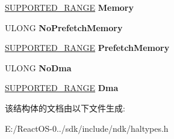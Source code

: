 \begin{DoxyCompactItemize}
\hyperlink{struct___s_u_p_p_o_r_t_e_d___r_a_n_g_e}{S\+U\+P\+P\+O\+R\+T\+E\+D\+\_\+\+R\+A\+N\+GE} {\bfseries Memory}
\item 
\mbox{\label{struct___s_u_p_p_o_r_t_e_d___r_a_n_g_e_s_a9b2a5d9a69304b85407dec15cbaf282f}} 
U\+L\+O\+NG {\bfseries No\+Prefetch\+Memory}
\item 
\mbox{\label{struct___s_u_p_p_o_r_t_e_d___r_a_n_g_e_s_a5c1184cc07a8a0029768b1ac4da22d4b}} 
\hyperlink{struct___s_u_p_p_o_r_t_e_d___r_a_n_g_e}{S\+U\+P\+P\+O\+R\+T\+E\+D\+\_\+\+R\+A\+N\+GE} {\bfseries Prefetch\+Memory}
\item 
\mbox{\label{struct___s_u_p_p_o_r_t_e_d___r_a_n_g_e_s_a9763656cea2a66838b07d43a1f010869}} 
U\+L\+O\+NG {\bfseries No\+Dma}
\item 
\mbox{\label{struct___s_u_p_p_o_r_t_e_d___r_a_n_g_e_s_a0aa0cce8c86ea529b64ace6c2f9c72a4}} 
\hyperlink{struct___s_u_p_p_o_r_t_e_d___r_a_n_g_e}{S\+U\+P\+P\+O\+R\+T\+E\+D\+\_\+\+R\+A\+N\+GE} {\bfseries Dma}
\end{DoxyCompactItemize}


该结构体的文档由以下文件生成\+:\begin{DoxyCompactItemize}
\item 
E\+:/\+React\+O\+S-\/0../sdk/include/ndk/haltypes.\+h\end{DoxyCompactItemize}
